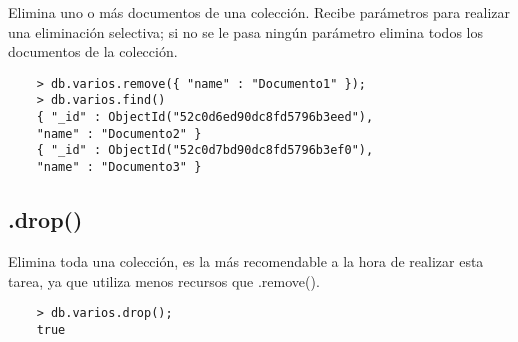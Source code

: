 Elimina uno o m\'as documentos de una colecci\'on. Recibe par\'ametros para realizar una eliminaci\'on selectiva; si no se le pasa ning\'un par\'ametro elimina todos los documentos de la colecci\'on. 

\begin{lstlisting}
    > db.varios.remove({ "name" : "Documento1" });
    > db.varios.find()
    { "_id" : ObjectId("52c0d6ed90dc8fd5796b3eed"),
    "name" : "Documento2" }
    { "_id" : ObjectId("52c0d7bd90dc8fd5796b3ef0"),
    "name" : "Documento3" }
\end{lstlisting}

\subsection{.drop()}

Elimina toda una colecci\'on, es la m\'as recomendable a la hora de realizar esta tarea, ya que utiliza menos recursos que .remove().

\begin{lstlisting}
    > db.varios.drop();
    true
\end{lstlisting}
